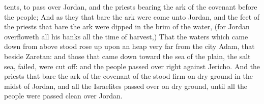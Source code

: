 {tents, to pass
over
Jordan, and the
priests
bearing the
ark of the
covenant
before the
people;
And as they that
bare the
ark were
come unto
Jordan, and the
feet of the
priests that
bare the
ark were
dipped in the
brim of the
water, (for
Jordan
overfloweth all his
banks all the
time of
harvest,)
That the
waters which came
down from
above
stood
{} rose
up upon
an
heap
very
far from the
city
Adam, that
{}
beside
Zaretan: and those that came
down toward the
sea of the
plain,
{} the
salt
sea,
failed,
{} were cut
off: and the
people passed
over right against
Jericho.
And the
priests that
bare the
ark of the
covenant of the
{}
stood
firm on dry
ground in the
midst of
Jordan, and all the
Israelites passed
over on dry
ground, until all the
people were
passed
clean
over
Jordan.

}
